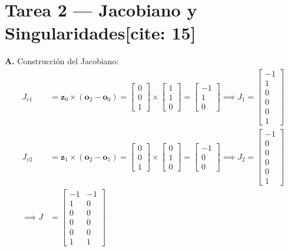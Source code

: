 \documentclass[11pt, a4paper]{article}
\begin{document}
\section*{Tarea 2 — Jacobiano y Singularidades[cite: 15]}
\textbf{A.} Construcción del Jacobiano:
\begin{align*}
    J_{v1} &= \mathbf{z}_0 \times (\mathbf{o}_2 - \mathbf{o}_0) = \begin{bmatrix} 0 \\ 0 \\ 1 \end{bmatrix} \times \begin{bmatrix} 1 \\ 1 \\ 0 \end{bmatrix} = \begin{bmatrix} -1 \\ 1 \\ 0 \end{bmatrix} \implies J_1 = \begin{bmatrix} -1 \\ 1 \\ 0 \\ 0 \\ 0 \\ 1 \end{bmatrix} \\
    J_{v2} &= \mathbf{z}_1 \times (\mathbf{o}_2 - \mathbf{o}_1) = \begin{bmatrix} 0 \\ 0 \\ 1 \end{bmatrix} \times \begin{bmatrix} 0 \\ 1 \\ 0 \end{bmatrix} = \begin{bmatrix} -1 \\ 0 \\ 0 \end{bmatrix} \implies J_2 = \begin{bmatrix} -1 \\ 0 \\ 0 \\ 0 \\ 0 \\ 1 \end{bmatrix} \\
    \implies J &= \begin{bmatrix} -1 & -1 \\ 1 & 0 \\ 0 & 0 \\ 0 & 0 \\ 0 & 0 \\ 1 & 1 \end{bmatrix}
\end{align*}
\end{document}
